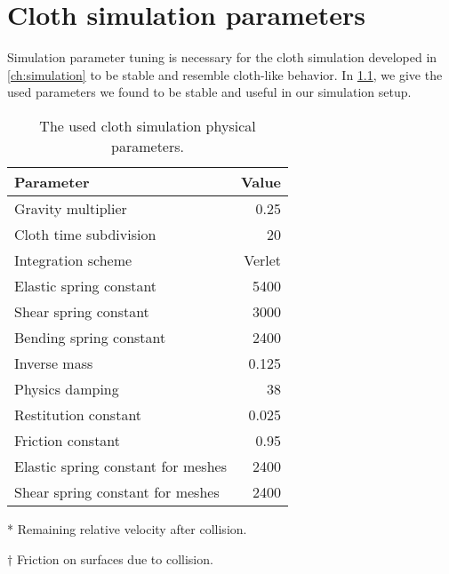 \documentclass[\home/main.tex]{subfiles}
\begin{document}
\chapter{Cloth simulation parameters}\label{appx:cloth_sim_params}
Simulation parameter tuning is necessary for the cloth simulation developed in \cref{ch:simulation} to be stable and resemble cloth-like behavior. In \cref{table:cloth_sim_params}, we give the used parameters we found to be stable and useful in our simulation setup.

\begin{table}[htb]
  \centering
  \begin{threeparttable}
    \caption{The used cloth simulation physical parameters.}
    \begin{tabular}[t]{@{} l r @{}}
      \toprule
      Parameter                          & Value  \\
      \midrule

      Gravity multiplier                 & 0.25   \\
      Cloth time subdivision             & 20     \\
      Integration scheme                 & Verlet \\
      Elastic spring constant            & 5400   \\
      Shear spring constant              & 3000   \\
      Bending spring constant            & 2400   \\
      Inverse mass                       & 0.125  \\
      Physics damping                    & 38     \\
      Restitution constant\tnote{*}      & 0.025  \\
      Friction constant\tnote{$\dagger$} & 0.95   \\
      Elastic spring constant for meshes & 2400   \\
      Shear spring constant for meshes   & 2400   \\

      \bottomrule
    \end{tabular}
    \begin{tablenotes}\footnotesize
      \item[*] Remaining relative velocity after collision.
      \item[$\dagger$] Friction on surfaces due to collision.
    \end{tablenotes}

    \label{table:cloth_sim_params}
  \end{threeparttable}
\end{table}
\end{document}
